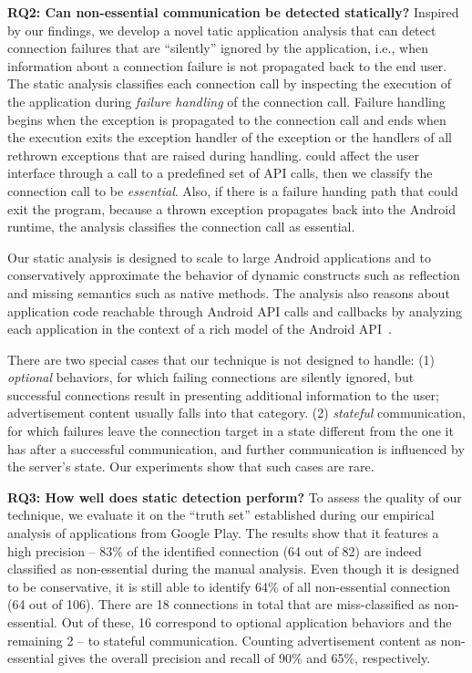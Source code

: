 \vspace{0.1in}
\noindent 
{\bf RQ2: Can non-essential communication be detected statically?}
Inspired by our findings, we develop a novel tatic application
analysis that can detect connection failures that are ``silently''
ignored by the application, i.e., when information about a connection
failure is not propagated back to the end user.  The static analysis
classifies each connection call by inspecting the execution of the
application during {\it failure handling} of the connection call.
Failure handling begins when the exception is propagated to the
connection call and ends when the execution exits the exception
handler of the exception or the handlers of all rethrown exceptions
that are raised during handling.  could affect the user interface
through a call to a predefined set of API calls, then we classify the
connection call to be {\em essential}.  Also, if there is a failure handing
path that could exit the program, because a thrown exception
propagates back into the Android runtime, the analysis classifies the
connection call as essential.

Our static analysis is designed to scale to large Android applications
and to conservatively approximate the behavior of dynamic constructs
such as reflection and missing semantics such as native methods.  The
analysis also reasons about application code reachable through Android
API calls and callbacks by analyzing each application in the context
of a rich model of the Android
API~\cite{Gordon:Kim:Perkins:Gilham:Nguyen:Rinard:NDSS15}. 

There are two special cases that our technique is not designed to handle: (1) \emph{optional} behaviors, for which failing connections are silently ignored, but successful connections result in presenting additional information to the user; 
advertisement content usually falls into that category. (2) \emph{stateful} communication, for which failures leave the 
connection target in a state different from the one it has after a successful communication, and further communication is influenced by the server's state. Our experiments show that such cases are rare. 

\vspace{0.1in}
\noindent 
{\bf RQ3: How well does static detection perform?}
To assess the quality of our technique, we evaluate it on the ``truth set'' established during our empirical analysis of applications from Google Play.
The results show that it features a high precision -- 83\% of the identified connection (64 out of 82) are indeed classified as non-essential during the manual analysis. Even though it is designed to be conservative, it is still able to identify  64\% of all non-essential connection (64 out of 106).
There are 18 connections in total that are miss-classified as non-essential. Out of these, 16 correspond to optional application behaviors and the remaining 2 -- to stateful communication. Counting advertisement content as non-essential
gives the overall precision and recall of 90\% and 65\%, respectively.  

